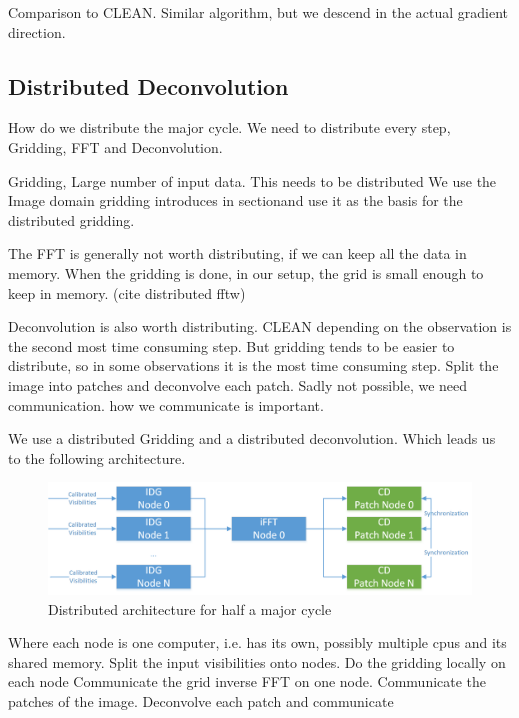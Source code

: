 Comparison to CLEAN. Similar algorithm, but we descend in the actual gradient direction.


\subsection{Distributed Deconvolution}
How do we distribute the major cycle. We need to distribute every step, Gridding, FFT and Deconvolution.

Gridding, Large number of input data. This needs to be distributed
We use the Image domain gridding introduces in sectionand use it as the basis for the distributed gridding.

The FFT is generally not worth distributing, if we can keep all the data in memory. When the gridding is done, in our setup, the grid is small enough to keep in memory. (cite distributed fftw)

Deconvolution is also worth distributing. CLEAN depending on the observation is the second most time consuming step. But gridding tends to be easier to distribute, so in some observations it is the most time consuming step.
Split the image into patches and deconvolve each patch.
Sadly not possible, we need communication. how we communicate is important.

We use a distributed Gridding and a distributed deconvolution. Which leads us to the following architecture.

\begin{figure}[h]
	\centering
	\includegraphics[width=0.80\linewidth]{./chapters/03.distribution/distributed_architecture.png}
	\caption{Distributed architecture for half a major cycle}
	\label{dist:architecture:fig}
\end{figure}

Where each node is one computer, i.e. has its own, possibly multiple cpus and its shared memory.
Split the input visibilities onto nodes. 
Do the gridding locally on each node
Communicate the grid
inverse FFT on one node.
Communicate the patches of the image.
Deconvolve each patch and communicate
